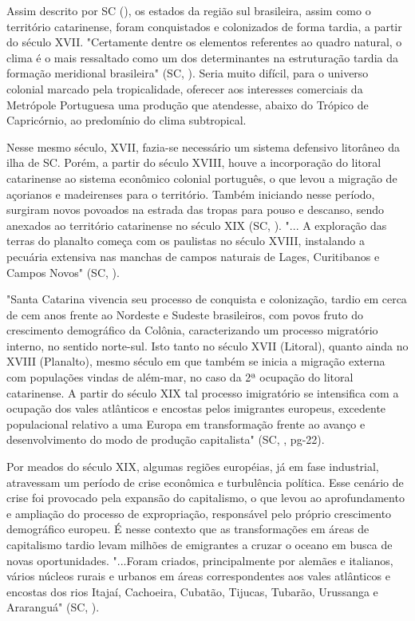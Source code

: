 \indent Assim descrito por \acrlong{SC} (\citeyear{AtlasSCpopulacao}), os estados da região sul brasileira, assim como o território catarinense, foram conquistados e colonizados de forma tardia, a partir do século XVII. "Certamente dentre os elementos referentes ao quadro natural, o clima é o mais ressaltado como um dos determinantes na estruturação tardia da formação meridional brasileira" (\acrlong{SC}, \citeyear{AtlasSCpopulacao}). Seria muito difícil, para o universo colonial marcado pela tropicalidade, oferecer aos interesses comerciais da Metrópole Portuguesa uma produção que atendesse, abaixo do Trópico de Capricórnio, ao predomínio do clima subtropical.

\indent Nesse mesmo século, XVII, fazia-se necessário um sistema defensivo litorâneo da ilha de \acrlong{SC}. Porém, a partir do século XVIII, houve a incorporação do litoral catarinense ao sistema econômico colonial português, o que levou a migração de açorianos e madeirenses para o território. Também iniciando nesse período, surgiram novos povoados na estrada das tropas para pouso e descanso, sendo anexados ao território catarinense no século XIX (\acrlong{SC}, \citeyear{AtlasSCterritorio}). "... A exploração das terras do planalto começa com os paulistas no século XVIII, instalando a pecuária extensiva nas manchas de campos naturais de Lages, Curitibanos e Campos Novos" (\acrlong{SC}, \citeyear{AtlasSCpopulacao}).

\begin{citacao}
"Santa Catarina vivencia seu processo de conquista e colonização, tardio em cerca
de cem anos frente ao Nordeste e Sudeste brasileiros, com povos fruto do crescimento demográfico da Colônia, caracterizando um processo migratório interno, no sentido norte-sul. Isto tanto no século XVII (Litoral), quanto ainda no XVIII (Planalto), mesmo século em que também se inicia a migração externa com populações vindas de além-mar, no caso da 2ª ocupação do litoral catarinense. A partir do século XIX tal processo imigratório se intensifica com a ocupação dos vales atlânticos e encostas pelos imigrantes europeus, excedente populacional  relativo a uma Europa em transformação frente ao avanço e desenvolvimento do modo de produção capitalista" (\acrlong{SC}, \citeyear{AtlasSCpopulacao}, pg-22). 
\end{citacao}

\indent Por meados do século XIX, algumas regiões européias, já em fase industrial, atravessam um período de crise econômica e turbulência política. Esse cenário de crise foi provocado pela expansão do capitalismo, o que levou ao aprofundamento e ampliação do processo de expropriação, responsável pelo próprio crescimento demográfico europeu. É nesse contexto que as transformações em áreas de capitalismo
tardio levam milhões de emigrantes a cruzar o oceano em busca de novas oportunidades. "...Foram criados, principalmente por alemães e italianos, vários núcleos rurais e urbanos em áreas correspondentes aos vales atlânticos e encostas dos rios Itajaí, Cachoeira, Cubatão, Tijucas, Tubarão, Urussanga e Araranguá" (\acrlong{SC}, \citeyear{AtlasSCpopulacao}).

